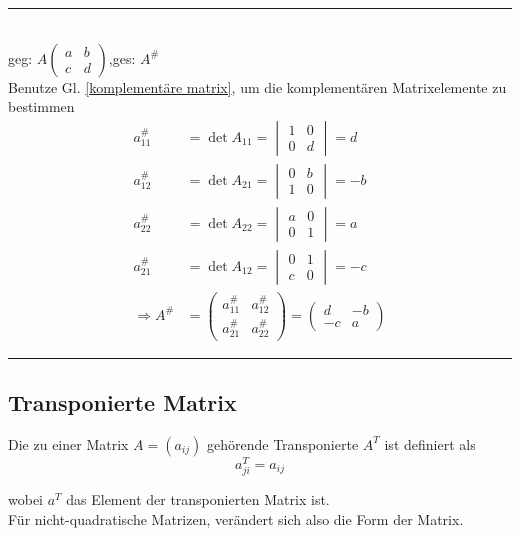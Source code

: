 \documentclass{article}
\begin{document}
{\color{blue}
\hrule
	\\
	geg: $A
	\begin{pmatrix}
		a & b \\
		c & d
	\end{pmatrix}$,\quad ges: $A^\#$\\
	Benutze Gl. \ref{komplementäre matrix}, um die komplementären Matrixelemente zu bestimmen
	\begin{align*}
		a_{11}^\# &= \det A_{11} =
		\begin{vmatrix}
			1 & 0\\
			0 & d
		\end{vmatrix}
		= d \\
				a_{12}^\# &= \det A_{21} =
		\begin{vmatrix}
			0 & b\\
			1 & 0
		\end{vmatrix}
		= -b \\
		a_{22}^\# &= \det A_{22} =
		\begin{vmatrix}
			a & 0\\
			0 & 1
		\end{vmatrix}
		= a \\
		a_{21}^\# &= \det A_{12} =
		\begin{vmatrix}
			0 & 1\\
			c & 0
		\end{vmatrix}
		= -c\\
		\Rightarrow A^\# &=
		\begin{pmatrix}
			a_{11}^\# & a_{12}^\#\\
			a_{21}^\# & a_{22}^\#
		\end{pmatrix}
		= 
		\begin{pmatrix}
			d & -b\\
			-c & a
		\end{pmatrix}
	\end{align*}


\hrule
}
\subsection{Transponierte Matrix}
Die zu einer Matrix $A=(a_{ij})$ gehörende Transponierte $A^T$ ist definiert als
	\begin{equation}
		a_{ji}^T = a_{ij}
	\end{equation}
	
wobei $a^T$ das Element der transponierten Matrix ist.\\
Für nicht-quadratische Matrizen, verändert sich also die Form der Matrix.
\end{document}
